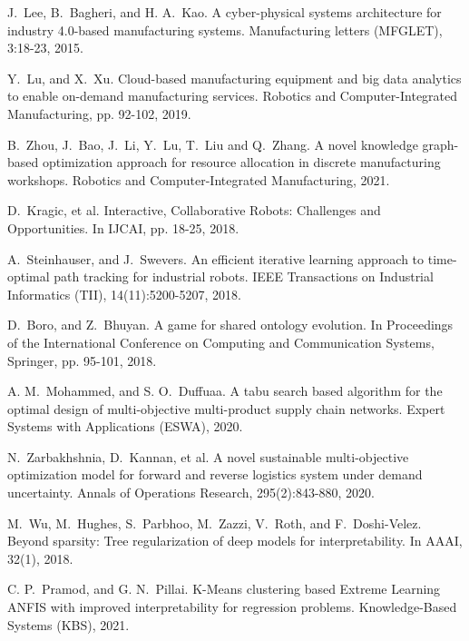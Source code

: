 \documentclass[11pt]{article}
\begin{document}
\begin{thebibliography}{10}
\begin{small}
 J.~Lee, B.~Bagheri, and H. A.~Kao. \newblock A cyber-physical systems architecture for industry 4.0-based manufacturing systems. \newblock Manufacturing letters (MFGLET), 3:18-23, 2015.

 Y.~Lu, and X.~Xu. \newblock Cloud-based manufacturing equipment and big data analytics to enable on-demand manufacturing services. \newblock Robotics and Computer-Integrated Manufacturing, pp. 92-102, 2019.

 B.~Zhou, J.~Bao, J.~Li, Y.~Lu, T.~Liu and Q.~Zhang. \newblock A novel knowledge graph-based optimization approach for resource allocation in discrete manufacturing workshops. \newblock Robotics and Computer-Integrated Manufacturing, 2021.


 D.~Kragic, et al. \newblock Interactive, Collaborative Robots: Challenges and Opportunities. \newblock In IJCAI, pp. 18-25, 2018.

 A.~Steinhauser, and J.~Swevers. \newblock An efficient iterative learning approach to time-optimal path tracking for industrial robots. \newblock IEEE Transactions on Industrial Informatics (TII), 14(11):5200-5207, 2018.

 D.~Boro, and Z.~Bhuyan. \newblock A game for shared ontology evolution. \newblock In Proceedings of the International Conference on Computing and Communication Systems, Springer, pp. 95-101, 2018.

 A. M.~Mohammed, and S. O.~Duffuaa. \newblock A tabu search based algorithm for the optimal design of multi-objective multi-product supply chain networks. \newblock  Expert Systems with Applications (ESWA), 2020.

 N.~Zarbakhshnia, D.~Kannan, et al.
\newblock A novel sustainable multi-objective optimization model for forward and reverse logistics system under demand uncertainty. \newblock Annals of Operations Research, 295(2):843-880, 2020.

 M.~Wu,  M.~Hughes, S.~Parbhoo, M.~Zazzi, V.~Roth, and F.~Doshi-Velez. \newblock Beyond sparsity: Tree regularization of deep models for interpretability. \newblock In AAAI, 32(1), 2018.

 C. P.~Pramod, and G. N.~Pillai. \newblock K-Means clustering based Extreme Learning ANFIS with improved interpretability for regression problems. \newblock Knowledge-Based Systems (KBS), 2021.

\end{small}
\end{thebibliography}
\end{document}
